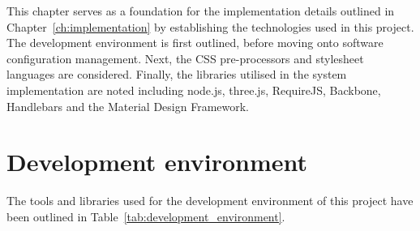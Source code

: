 
This chapter serves as a foundation for the implementation details outlined in Chapter~\ref{ch:implementation} by establishing the technologies used in this project. The development environment is first outlined, before moving onto software configuration management. Next, the CSS pre-processors and stylesheet languages are considered. Finally, the libraries utilised in the system implementation are noted including node.js, three.js, RequireJS, Backbone, Handlebars and the Material Design Framework.

\section{Development environment} {
\label{sec:development_environment}

	The tools and libraries used for the development environment of this project have been outlined in Table~\ref{tab:development_environment}.

	

}

